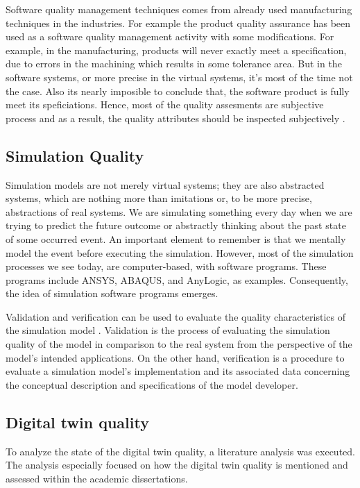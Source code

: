 \documentclass{llncs}
\begin{document}
    Software quality management techniques comes from already used manufacturing techniques in the  industries. For example the  product quality assurance has been used as a software quality management activity with some modifications. For example, in the manufacturing, products will never exactly meet a specification, due to errors in the machining which results in some tolerance area. But in the software systems, or more precise in the virtual systems, it's most of the time not the case. Also its nearly imposible to conclude that, 
    the software product is fully meet its speficiations. 
    Hence, most of the quality assesments are subjective process and as a result, the quality attributes should be inspected subjectively \cite{SoftwareEngineering}.  

    \subsection{Simulation Quality}
    Simulation models are not merely virtual systems; 
    they are also abstracted systems, which are nothing more than imitations or, 
    to be more precise, abstractions of real systems. 
    We are simulating something every day when we are trying 
    to predict the future outcome or abstractly thinking about the past state of some occurred event. 
    An important element to remember is that we mentally model the 
    event before executing the simulation. However, most of the simulation processes we see today, 
    are computer-based, with software programs. These programs 
    include ANSYS\cite{Ansys}, ABAQUS\cite{Abaqus}, and 
    AnyLogic\cite{AnyLogic}, as examples. Consequently, the idea of simulation software programs emerges.

    Validation and verification can be used to evaluate the quality characteristics of the simulation model \cite{StewartSimulation} \cite{VerificationValidationSergent} \cite{OsmanBalci}. 
    Validation is the process of evaluating the simulation quality of the model in comparison to the real system from the perspective of the model's intended applications. 
    On the other hand, verification is a procedure to evaluate a simulation model's implementation and its associated data concerning the conceptual description and specifications of the model developer. 

    \subsection{Digital twin quality}
    To analyze the state of the digital twin quality, a literature analysis was executed. 
    The analysis especially focused on how the digital twin quality is mentioned and assessed within the academic dissertations.
\end{document}

